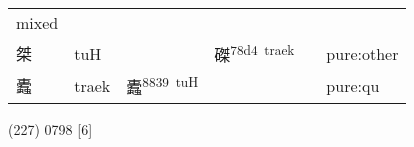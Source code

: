 \documentclass[14pt,a4paper]{scrartcl}
\begin{document}
\begin{longtable}[c]{@{}llllll@{}}
\begin{minipage}[t]{0.14\columnwidth}\raggedright\strut
mixed
\strut\end{minipage}\tabularnewline
\begin{minipage}[t]{0.14\columnwidth}\raggedright\strut
桀
\strut\end{minipage} &
\begin{minipage}[t]{0.14\columnwidth}\raggedright\strut
tuH
\strut\end{minipage} &
\begin{minipage}[t]{0.14\columnwidth}\raggedright\strut
\strut\end{minipage} &
\begin{minipage}[t]{0.14\columnwidth}\raggedright\strut
磔\textsuperscript{78d4~traek}
\strut\end{minipage} &
\begin{minipage}[t]{0.14\columnwidth}\raggedright\strut
\strut\end{minipage} &
\begin{minipage}[t]{0.14\columnwidth}\raggedright\strut
pure:other
\strut\end{minipage}\tabularnewline
\begin{minipage}[t]{0.14\columnwidth}\raggedright\strut
蠹
\strut\end{minipage} &
\begin{minipage}[t]{0.14\columnwidth}\raggedright\strut
traek
\strut\end{minipage} &
\begin{minipage}[t]{0.14\columnwidth}\raggedright\strut
蠹\textsuperscript{8839~tuH}
\strut\end{minipage} &
\begin{minipage}[t]{0.14\columnwidth}\raggedright\strut
\strut\end{minipage} &
\begin{minipage}[t]{0.14\columnwidth}\raggedright\strut
\strut\end{minipage} &
\begin{minipage}[t]{0.14\columnwidth}\raggedright\strut
pure:qu
\strut\end{minipage}\tabularnewline
\bottomrule
\end{longtable}

(227) 0798 {[}6{]}
\end{document}
